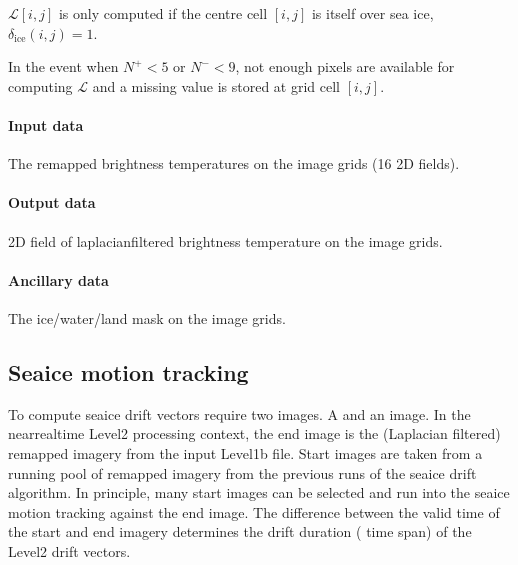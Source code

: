\documentclass[letterpaper,10pt,english]{jupyterBook}
\begin{document}
\sphinxAtStartPar
\(\mathcal{L}[i,j]\) is only computed if the centre cell \([i,j]\) is itself
over sea ice, \(\delta_{\textrm{ice}}(i,j)=1\).

\sphinxAtStartPar
In the event when \(N^{+} < 5\) or \(N^{-} < 9\), not enough pixels are
available for computing \(\mathcal{L}\) and a missing value is stored at
grid cell \([i,j]\).


\paragraph{Input data}
\label{\detokenize{baseline_algorithm_definition:id6}}
\sphinxAtStartPar
The remapped brightness temperatures on the image grids (16 2D fields).


\paragraph{Output data}
\label{\detokenize{baseline_algorithm_definition:id7}}
 2D field of laplacian\sphinxhyphen{}filtered brightness temperature on the image grids.


\paragraph{Ancillary data}
\label{\detokenize{baseline_algorithm_definition:id8}}
\sphinxAtStartPar
The ice/water/land mask on the image grids.


\subsection{Sea\sphinxhyphen{}ice motion tracking}
\label{\detokenize{baseline_algorithm_definition:sea-ice-motion-tracking}}
\sphinxAtStartPar
To compute sea\sphinxhyphen{}ice drift vectors require two images. A  and an  image. In the near\sphinxhyphen{}real\sphinxhyphen{}time Level\sphinxhyphen{}2 processing context, the end image is the (Laplacian filtered) remapped imagery
from the input Level\sphinxhyphen{}1b file. Start images are taken from a running pool of remapped imagery from the previous runs of the sea\sphinxhyphen{}ice drift algorithm. In principle, many start images can be selected
and run into the sea\sphinxhyphen{}ice motion tracking against the end image. The difference between the valid time of the start and end imagery determines the drift duration ( time span) of the Level\sphinxhyphen{}2
drift vectors.
\end{document}
